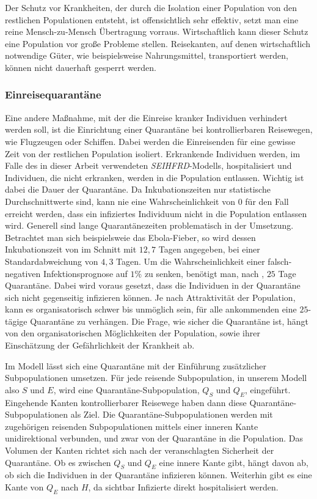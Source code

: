 Der Schutz vor Krankheiten, der durch die Isolation einer Population von den restlichen Populationen entsteht, ist offensichtlich sehr effektiv, setzt man eine reine Mensch-zu-Mensch Übertragung vorraus. Wirtschaftlich kann dieser Schutz eine Population vor große Probleme stellen. Reisekanten, auf denen wirtschaftlich notwendige Güter, wie beispielsweise Nahrungsmittel, transportiert werden, können nicht dauerhaft gesperrt werden. 

\subsubsection{Einreisequarantäne}\steffen
Eine andere Maßnahme, mit der die Einreise kranker Individuen verhindert werden soll, ist die Einrichtung einer Quarantäne bei kontrollierbaren Reisewegen, wie Flugzeugen oder Schiffen. Dabei werden die Einreisenden für eine gewisse Zeit von der restlichen Population isoliert. Erkrankende Individuen werden, im Falle des in dieser Arbeit verwendeten \emph{SEIHFRD}-Modells, hospitalisiert und Individuen, die nicht erkranken, werden in die Population entlassen. Wichtig ist dabei die Dauer der Quarantäne. Da Inkubationszeiten nur statistische Durchschnittwerte sind, kann nie eine Wahrscheinlichkeit von 0 für den Fall erreicht werden, dass ein infiziertes Individuum nicht in die Population entlassen wird. Generell sind lange Quarantänezeiten problematisch in der Umsetzung. Betrachtet man sich beispielsweie das Ebola-Fieber, so wird dessen Inkubationszeit von \cite{Eichner2011} im Schnitt mit $12,7$ Tagen angegeben, bei einer Standardabweichung von $4,3$ Tagen. Um die Wahrscheinlichkeit einer falsch-negativen Infektionsprognose auf $1\%$ zu senken, benötigt man, nach \cite[4]{Eichner2011}, $25$ Tage Quarantäne. Dabei wird voraus gesetzt, dass die Individuen in der Quarantäne sich nicht gegenseitig infizieren können. Je nach Attraktivität der Population, kann es organisatorisch schwer bis unmöglich sein, für alle ankommenden eine $25$-tägige Quarantäne zu verhängen. Die Frage, wie sicher die Quarantäne ist, hängt von den organisatorischen Möglichkeiten der Population, sowie ihrer Einschätzung der Gefährlichkeit der Krankheit ab. 

Im Modell lässt sich eine Quarantäne mit der Einführung zusätzlicher Subpopulationen umsetzen. Für jede reisende Subpopulation, in unserem Modell also $S$ und $E$, wird eine Quarantäne-Subpopulation, $Q_S$ und $Q_E$, eingeführt. Eingehende Kanten kontrollierbarer Reisewege haben dann diese Quarantäne-Subpopulationen als Ziel. Die Quarantäne-Subpopulationen werden mit zugehörigen reisenden Subpopulationen mittels einer inneren Kante unidirektional verbunden, und zwar von der Quarantäne in die Population. Das Volumen der Kanten richtet sich nach der veranschlagten Sicherheit der Quarantäne. Ob es zwischen $Q_S$ und $Q_E$ eine innere Kante gibt, hängt davon ab, ob sich die Individuen in der Quarantäne infizieren können. Weiterhin gibt es eine Kante von $Q_E$ nach $H$, da sichtbar Infizierte direkt hospitalisiert werden. 

